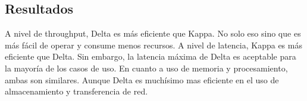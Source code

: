\newpage

\subsection{Resultados}

A nivel de throughput, Delta es más eficiente que Kappa. No solo eso sino que es más fácil de operar y consume menos recursos.
A nivel de latencia, Kappa es más eficiente que Delta. Sin embargo, la latencia máxima de Delta es aceptable para la mayoría de los casos de uso.
En cuanto a uso de memoria y procesamiento, ambas son similares. Aunque Delta es muchísimo mas eficiente en el uso de almacenamiento y transferencia de red. 

\newpage